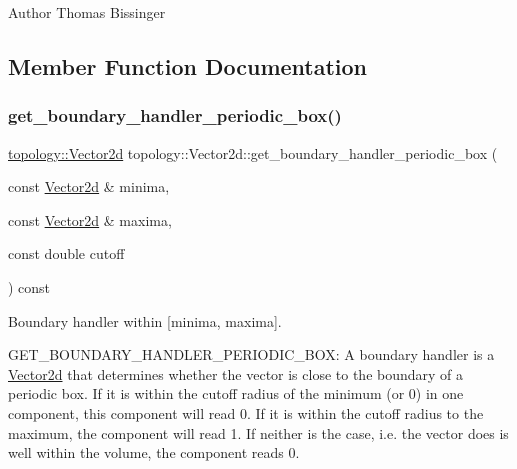 \begin{DoxyAuthor}{Author}
Thomas Bissinger 
\end{DoxyAuthor}


\subsection{Member Function Documentation}
\mbox{\label{classtopology_1_1Vector2d_a7917561de0e6efc767aa16280cd560c6}} 
\subsubsection{\texorpdfstring{get\+\_\+boundary\+\_\+handler\+\_\+periodic\+\_\+box()}{get\_boundary\_handler\_periodic\_box()}}
{\footnotesize\ttfamily \mbox{\hyperlink{classtopology_1_1Vector2d}{topology\+::\+Vector2d}} topology\+::\+Vector2d\+::get\+\_\+boundary\+\_\+handler\+\_\+periodic\+\_\+box (\begin{DoxyParamCaption}\item[{const \mbox{\hyperlink{classtopology_1_1Vector2d}{Vector2d}} \&}]{minima,  }\item[{const \mbox{\hyperlink{classtopology_1_1Vector2d}{Vector2d}} \&}]{maxima,  }\item[{const double}]{cutoff }\end{DoxyParamCaption}) const}



Boundary handler within \mbox{[}minima, maxima\mbox{]}. 

G\+E\+T\+\_\+\+B\+O\+U\+N\+D\+A\+R\+Y\+\_\+\+H\+A\+N\+D\+L\+E\+R\+\_\+\+P\+E\+R\+I\+O\+D\+I\+C\+\_\+\+B\+OX\+: A boundary handler is a \mbox{\hyperlink{classtopology_1_1Vector2d}{Vector2d}} that determines whether the vector is close to the boundary of a periodic box. If it is within the cutoff radius of the minimum (or 0) in one component, this component will read 0. If it is within the cutoff radius to the maximum, the component will read 1. If neither is the case, i.\+e. the vector does is well within the volume, the component reads 0. \mbox{\label{classtopology_1_1Vector2d_acbc60af5c9b08102b168e9606d01bbab}} 
